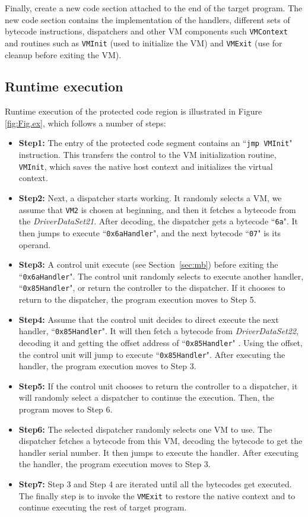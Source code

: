 Finally, \DSVMP create a new code section attached to the end of the target program.
The new code section contains the implementation of the handlers, different sets of bytecode instructions,
dispatchers and other VM components such \texttt{VMContext} and routines such as
\texttt{VMInit} (used to initialize the VM) and \texttt{VMExit} (use for cleanup before exiting the VM).



\subsection{Runtime execution}
Runtime execution of the protected code region is illustrated in Figure \ref{fig:Fig.ex}, which follows a number of steps:
\begin{itemize}
\item \textbf{Step1:} The entry of the protected code segment contains an ``\texttt{jmp VMInit}" instruction. This transfers the control to the VM initialization routine, \texttt{VMInit}, which saves the native host context and initializes the virtual context.
\item \textbf{Step2:} Next, a dispatcher starts working. It randomly selects a VM, we assume that \texttt{VM2} is chosen at beginning, and then it fetches a bytecode from the \emph{DriverDataSet21}. After decoding, the dispatcher gets a bytecode ``\texttt{6a}". It then jumps to execute ``\texttt{0x6aHandler}", and the next bytecode ``\texttt{07}" is its operand.
\item \textbf{Step3:} A control unit execute (see Section~\ref{sec:mb}) before exiting the ``\texttt{0x6aHandler}". The control unit randomly selects to execute another handler, ``\texttt{0x85Handler}", or return the controller to the dispatcher. If it chooses to return to the dispatcher, the program execution moves to Step 5.
\item \textbf{Step4:} Assume that the control unit decides to direct execute the next handler, ``\texttt{0x85Handler}". It will then fetch a bytecode from \emph{DriverDataSet22}, decoding it and getting the offset address of ``\texttt{0x85Handler}" . Using the offset, the control unit will jump to execute ``\texttt{0x85Handler}". After executing the handler, the program execution moves to Step 3.
\item \textbf{Step5:} If the control unit chooses to return the controller to a dispatcher, it will randomly select a dispatcher to continue the execution. Then, the program moves to Step 6.
\item \textbf{Step6:} The selected dispatcher randomly selects one VM to use. The dispatcher fetches a bytecode from this VM, decoding the bytecode to get the handler serial number.
    It then jumps to execute the handler. After executing the handler, the program execution moves to Step 3.
\item \textbf{Step7:} Step 3 and Step 4 are iterated until all the bytecodes get executed. The finally step is to invoke the \texttt{VMExit} to restore the native context and to continue executing the rest of target program.
\end{itemize}

